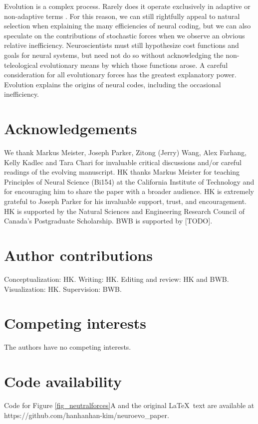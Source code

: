 \documentclass[twocolumn]{article}
\begin{document}
Evolution is a complex process. Rarely does it operate exclusively in adaptive or non-adaptive terms \cite{Gould_Lewontin_1979}. For this reason, we can still rightfully appeal to natural selection when explaining the many efficiencies of neural coding, but we can also speculate on the contributions of stochastic forces when we observe an obvious relative inefficiency. Neuroscientists must still hypothesize cost functions and goals for neural systems, but need not do so without acknowledging the non-teleological evolutionary means by which those functions arose. A careful consideration for all evolutionary forces has the greatest explanatory power. Evolution explains the origins of neural codes, including the occasional inefficiency. 

\newpage
\section*{Acknowledgements}
We thank Markus Meister, Joseph Parker, Zitong (Jerry) Wang, Alex Farhang, Kelly Kadlec and Tara Chari for invaluable critical discussions and/or careful readings of the evolving manuscript. HK thanks Markus Meister for teaching Principles of Neural Science (Bi154) at the California Institute of Technology and for encouraging him to share the paper with a broader audience. HK is extremely grateful to Joseph Parker for his invaluable support, trust, and encouragement. HK is supported by the Natural Sciences and Engineering Research Council of Canada's Postgraduate Scholarship. BWB is supported by [TODO]. 

\section*{Author contributions}
Conceptualization: HK. Writing: HK. Editing and review: HK and BWB. Visualization: HK. Supervision: BWB. 

\section*{Competing interests}
The authors have no competing interests.

\section*{Code availability}
Code for Figure \ref{fig_neutralforces}A and the original \LaTeX \ text are available at https://github.com/hanhanhan-kim/neuroevo\_paper. 

\newpage
 




\end{document}
